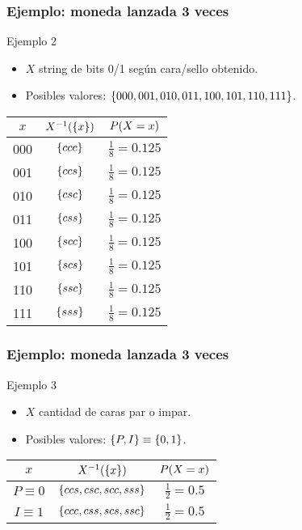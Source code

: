 \documentclass[table]{beamer}
\begin{document}

\begin{frame}
    \frametitle{Ejemplo: moneda lanzada 3 veces}
    \begin{exampleblock}{Ejemplo 2}
        \begin{itemize}
            \item $X$ string de bits 0/1 según cara/sello obtenido.
            \item Posibles valores: $\bparens{000, 001, 010, 011, 100, 101, 110, 111}$.
        \end{itemize}
    \end{exampleblock}
    \begin{center}
        \begin{tabular}{ccc}
            $x$ & $X^{-1} \parens{\bparens{x}}$ & $\prob{X = x}$ \\
            \hline
            000 & $\bparens{ccc}$ & $\frac{1}{8} = 0.125$ \\
            001 & $\bparens{ccs}$ & $\frac{1}{8} = 0.125$ \\
            010 & $\bparens{csc}$ & $\frac{1}{8} = 0.125$ \\
            011 & $\bparens{css}$ & $\frac{1}{8} = 0.125$ \\
            100 & $\bparens{scc}$ & $\frac{1}{8} = 0.125$ \\
            101 & $\bparens{scs}$ & $\frac{1}{8} = 0.125$ \\
            110 & $\bparens{ssc}$ & $\frac{1}{8} = 0.125$ \\
            111 & $\bparens{sss}$ & $\frac{1}{8} = 0.125$
        \end{tabular}
    \end{center}
\end{frame}

\begin{frame}
    \frametitle{Ejemplo: moneda lanzada 3 veces}
    \begin{exampleblock}{Ejemplo 3}
        \begin{itemize}
            \item $X$ cantidad de caras par o impar.
            \item Posibles valores: $\bparens{P, I} \equiv \bparens{0, 1}$.
        \end{itemize}
    \end{exampleblock}
    \begin{center}
        \begin{tabular}{ccc}
            $x$ & $X^{-1} \parens{\bparens{x}}$ & $\prob{X = x}$ \\
            \hline
            $P \equiv 0$ & $\bparens{ccs, csc, scc, sss}$ & $\frac{1}{2} = 0.5$ \\
            $I \equiv 1$ & $\bparens{ccc, css, scs, ssc}$ & $\frac{1}{2} = 0.5$
        \end{tabular}
    \end{center}
\end{frame}
\end{document}
